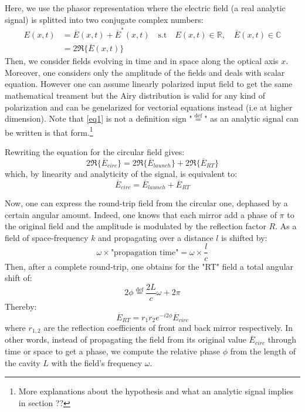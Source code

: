 \documentclass[12pt]{report}
\begin{document}
Here, we use the phasor representation where the electric field (a real analytic signal) is splitted into two conjugate complex numbers:
\begin{align} 
\label{eq1}
E(x, t) &= \overline{E}(x, t) + \overline{E}^*(x, t) \quad \textrm{s.t} \quad E(x, t) \in \mathbb{R}, \quad \overline{E}(x, t) \in \mathbb{C} \\\label{eq2}
&= 2 \Re \{  \overline{E}(x, t) \} 
\end{align}
Then, we consider fields evolving in time and in space along the optical axis $ x$. Moreover, one considers only the amplitude of the fields and deals with scalar equation. However one can assume linearly polarized input field to get the same mathematical treament but the Airy distribution is valid for any kind of polarization and can be genelarized for vectorial equations instead (i.e at higher dimension). Note that \eqref{eq1} is not a definition sign "$\stackrel{\text{def}}{=}$" as an analytic signal can be written is that form.\footnote{More explanations about the hypothesis and what an analytic signal implies in section ??}

Rewriting the equation for the circular field gives:
\begin{equation}
2\Re\{\overline{E}_{circ}\} = 2\Re\{\overline{E}_{launch}\} + 2\Re\{\overline{E}_{RT}\}
\end{equation}
which, by linearity and analyticity of the signal, is equivalent to:
\begin{equation}
\label{eqecirc}
\overline{E}_{circ} = \overline{E}_{launch} + \overline{E}_{RT}
\end{equation}

Now, one can express the round-trip field from the circular one, dephased by a certain angular amount. Indeed, one knows that each mirror add a phase of $\pi$ to the original field and the amplitude is modulated by the reflection factor $R$. As a field of space-frequency $k$ and propagating over a distance $l$ is shifted by:
\begin{equation}
\omega \times \textrm{"propagation time"} = \omega \times \frac{l}{c}
\end{equation} 
Then, after a complete round-trip, one obtains for the "RT" field a total angular shift of:
\begin{equation}
2\phi \stackrel{\text{def}}{=} \frac{2L}{c}\omega + 2\pi
\end{equation} 
Thereby:
\begin{equation}
\label{eqrt}
\overline{E}_{RT} = r_1 r_2 e^{-i2\phi} \overline{E}_{circ}
\end{equation}
where $r_{1,2}$ are the reflection coefficients of front and back mirror respectively. In other words, instead of propagating the field from its original value $ \overline{E}_{circ}$ through time or space to get a phase, we compute the relative phase $\phi$ from the length of the cavity $L$ with the field's frequency $\omega$.
\end{document}
